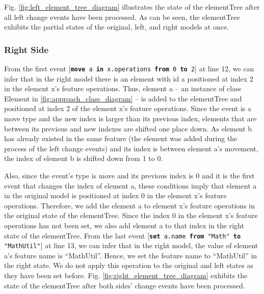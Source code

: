 \documentclass{jot}
\begin{document}
    Fig. \ref{fig:left_element_tree_diagram} illustrates the state of the \textsf{elementTree} after all left change events have been processed. As can be seen, the \textsf{elementTree} exhibits the partial states of the original, left, and right models at once. 
    
    \subsubsection{Right Side}\label{sec:right_side}  From the first event [\texttt{\small \textbf{move} a \textbf{in} x.operations \textbf{from} 0 \textbf{to} 2}] at line 12, we can infer that in the right model there is an element with id \textsf{a} positioned at index 2 in the element \textsf{x}'s feature \textsf{operations}. Thus, element \textsf{a} -- an instance of class \textsf{Element} in \ref{fig:approach_class_diagram} -- is added to the \textsf{elementTree} and positioned at index 2 of the element \textsf{x}'s feature \textsf{operations}. Since the event is a \textsf{move} type and the new index is larger than its previous index, elements that are between its previous and new indexes are shifted one place down. As element \textsf{b} has already existed in the same feature (the element was added during the process of the left change events) and its index is between element \textsf{a}'s movement, the index of element \textsf{b} is shifted down from 1 to 0. 
    
    Also, since the event's type is \textsf{move} and its previous index is 0 and it is the first event that changes the index of element \textsf{a}, these conditions imply that element \textsf{a} in the original model is positioned at index 0 in the element \textsf{x}'s feature \textsf{operations}. Therefore, we add the element \textsf{a} to element \textsf{x}'s feature \textsf{operations} in the original state of the \textsf{elementTree}. Since the index 0 in the element \textsf{x}'s feature \textsf{operations} has not been set, we also add element \textsf{a} to that index in the right state of the \textsf{elementTree}. From the last event [\texttt{\small \textbf{set} a.name \textbf{from} "Math" \textbf{to} "MathUtil"}] at line 13, we can infer that in the right model, the value of element \textsf{a}'s feature \textsf{name} is ``MathUtil''. Hence, we set the feature \textsf{name} to ``MathUtil'' in the right state. 
    We do not apply this operation to the original and left states as they have been set before.
    Fig. \ref{fig:right_element_tree_diagram} exhibits the state of the \textsf{elementTree} after both sides' change events have been processed.
    
\end{document}
